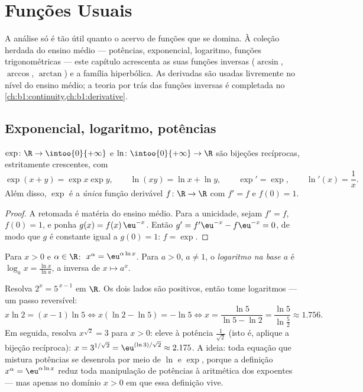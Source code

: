 \chapter{Funções Usuais}\label{ch:b1:functions}

A análise só é tão útil quanto o acervo de funções que se domina. À
coleção herdada do ensino médio --- potências, exponencial,
logaritmo, funções trigonométricas --- este capítulo acrescenta as suas
funções inversas ($\arcsin$, $\arccos$, $\arctan$) e a família
hiperbólica. As derivadas são usadas livremente no nível do ensino
médio; a teoria por trás das funções inversas é completada no
\cref{ch:b1:continuity,ch:b1:derivative}.

\section{Exponencial, logaritmo, potências}

\begin{proposition}\label{prop:b1:functions:expln}
$\exp \colon \R \to \intoo{0}{+\infty}$ e $\ln \colon
\intoo{0}{+\infty} \to \R$ são bijeções recíprocas, estritamente
crescentes, com
\[
\exp(x + y) = \exp x \exp y, \qquad \ln(xy) = \ln x + \ln y,
\qquad \exp' = \exp, \qquad \ln'(x) = \frac 1x .
\]
Além disso, $\exp$ é a \emph{única} função derivável $f \colon
\R \to \R$ com $f' = f$ e $f(0) = 1$.
\end{proposition}

\begin{proof}
A retomada é matéria do ensino médio. Para a unicidade, sejam $f' = f$,
$f(0) = 1$, e ponha $g(x) = f(x)\,\eu^{-x}$. Então $g' = f'\eu^{-x} -
f\eu^{-x} = 0$, de modo que $g$ é constante igual a $g(0) = 1$: $f = \exp$.
\end{proof}

\begin{definition}\label{def:b1:functions:powers}
Para $x > 0$ e $\alpha \in \R$:
$\;x^\alpha = \eu^{\alpha \ln x}$. Para $a > 0$,
$a \neq 1$, o \emph{logaritmo na base $a$} é $\log_a x =
\frac{\ln x}{\ln a}$, a inversa de $x \mapsto a^x$.
\end{definition}

\begin{example}\label{ex:b1:functions:expequations}
Resolva $2^x = 5^{\,x-1}$ em $\R$. Os dois lados são positivos, então tome
logaritmos --- um passo reversível:
\[
x\ln2 = (x - 1)\ln5
\iff x(\ln2 - \ln5) = -\ln5
\iff x = \frac{\ln5}{\ln5 - \ln2} = \frac{\ln 5}{\ln\frac52}
\approx 1.756 .
\]
Em seguida, resolva $x^{\sqrt2} = 3$ para $x > 0$: eleve à potência
$\frac1{\sqrt2}$ (isto é, aplique a bijeção recíproca):
$x = 3^{1/\sqrt2} = \eu^{(\ln 3)/\sqrt2} \approx 2.175$. A ideia:
toda equação que mistura potências se desenrola por meio de $\ln$ e
$\exp$, porque a definição $x^\alpha = \eu^{\alpha\ln x}$
reduz toda manipulação de potências à aritmética dos expoentes ---
mas apenas no domínio $x > 0$ em que essa definição vive.
\end{example}

